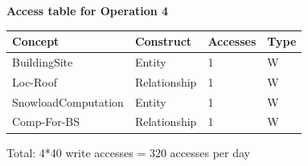 \documentclass{article}[h]
\begin{document}
\vspace{12px}

{\centering \textbf{Access table for Operation 4}\\}
\begin{table}[H]
  \def\arraystretch{1.10}%
  \centering
  \begin{tabular}{ | m{4cm} | m{4cm}| m{3cm} | m{2cm} |} 
    \hline
    {\textbf{\large Concept}} & {\textbf{\large Construct}} & {\textbf{\large Accesses}} & {\textbf{\large Type}} \\
    \hline
    \color[HTML]{3531FF} BuildingSite & Entity & 1 & W \\ 
    \hline
    \color[HTML]{3531FF} Loc-Roof & Relationship & 1 & W \\ 
    \hline
    \color[HTML]{3531FF} SnowloadComputation & Entity & 1 & W \\ 
    \hline
    \color[HTML]{3531FF} Comp-For-BS & Relationship & 1 & W \\ 
    \hline
  \end{tabular}
\end{table}
Total: 4*40 write accesses = 320 accesses per day

\vspace{12px}
\end{document}
